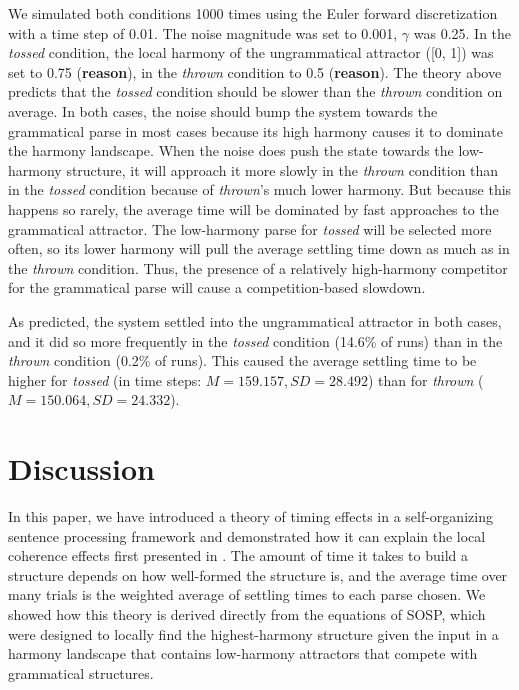 \documentclass[10pt,letterpaper]{article}
\begin{document}
We simulated both conditions 1000 times using the Euler forward discretization with a time step of 0.01. The noise magnitude was set to 0.001, $\gamma$ was 0.25. In the \emph{tossed} condition, the local harmony of the ungrammatical attractor ([0, 1]) was set to 0.75 (\textbf{reason}), in the \emph{thrown} condition to 0.5 (\textbf{reason}). The theory above predicts that the \emph{tossed} condition should be slower than the \emph{thrown} condition on average. In both cases, the noise should bump the system towards the grammatical parse in most cases because its high harmony causes it to dominate the harmony landscape. When the noise does push the state towards the low-harmony structure, it will approach it more slowly in the \emph{thrown} condition than in the \emph{tossed} condition because of \emph{thrown}'s much lower harmony. But because this happens so rarely, the average time will be dominated by fast approaches to the grammatical attractor. The low-harmony parse for \emph{tossed} will be selected more often, so its lower harmony will pull the average settling time down as much as in the \emph{thrown} condition. Thus, the presence of a relatively high-harmony competitor for the grammatical parse will cause a competition-based slowdown.

As predicted, the system settled into the ungrammatical attractor in both cases, and it did so more frequently in the \emph{tossed} condition (14.6\% of runs) than in the \emph{thrown} condition (0.2\% of runs). This caused the average settling time to be higher for \emph{tossed} (in time steps: $M = 159.157, SD = 28.492$) than for \emph{thrown} ($M = 150.064, SD = 24.332$).

\section{Discussion}
In this paper, we have introduced a theory of timing effects in a self-organizing sentence processing framework and demonstrated how it can explain the local coherence effects first presented in \cite{tabor2004effects}. The amount of time it takes to build a structure depends on how well-formed the structure is, and the average time over many trials is the weighted average of settling times to each parse chosen. We showed how this theory is derived directly from the equations of SOSP, which were designed to locally find the highest-harmony structure given the input in a harmony landscape that contains low-harmony attractors that compete with grammatical structures.
\end{document}
